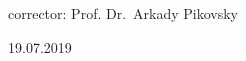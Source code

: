 \begin{titlepage}
\begin{center}
\begin{minipage}{0.45\textwidth}
\begin{flushleft}
\end{flushleft}
\end{minipage}
\hfill
\begin{minipage}{0.45\textwidth}
\begin{flushright} \normalsize 
\begin{flushleft}
corrector: Prof. Dr.~Arkady Pikovsky\\
\end{flushleft}
\end{flushright}
\end{minipage}

\vfill
{\normalsize  19.07.2019}
\vspace*{4.5cm}


\end{center}

\end{titlepage}